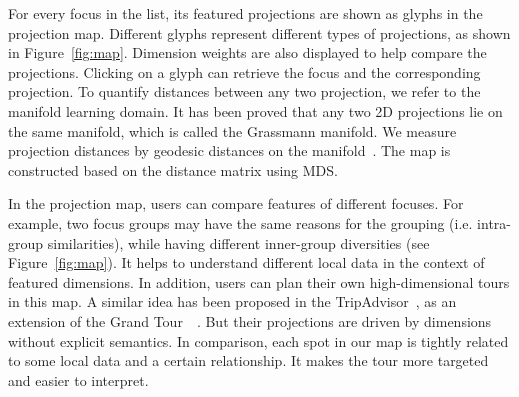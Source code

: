 For every focus in the list, its featured projections are shown as glyphs in the projection map. Different glyphs represent different types of projections, as shown in Figure~\ref{fig:map}. Dimension weights are also displayed to help compare the projections. Clicking on a glyph can retrieve the focus and the corresponding projection. To quantify distances between any two projection, we refer to the manifold learning domain. It has been proved that any two 2D projections lie on the same manifold, which is called the Grassmann manifold. We measure projection distances by geodesic distances on the manifold~\cite{absil2004riemannian}. The map is constructed based on the distance matrix using MDS.

In the projection map, users can compare features of different focuses. For example, two focus groups may have the same reasons for the grouping (i.e. intra-group similarities), while having different inner-group diversities (see Figure~\ref{fig:map}). It helps to understand different local data in the context of featured dimensions. In addition, users can plan their own high-dimensional tours in this map. A similar idea has been proposed in the TripAdvisor~\cite{DBLP:journals/tvcg/NamM13}, as an extension of the Grand Tour~\cite{asimov1985grand}~\cite{cook1995grand}. But their projections are driven by dimensions without explicit semantics. In comparison, each spot in our map is tightly related to some local data and a certain relationship. It makes the tour more targeted and easier to interpret.